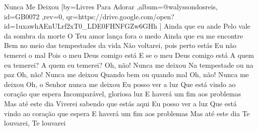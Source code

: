 \beginsong
{Nunca Me Deixou %
}[by={Livres Para Adorar %
},album={@walyssondosreis},
id={GB0072 %
},rev={0}, %
qr={https://drive.google.com/open?id=1uxawhAEnULrf2xT0_LDE0FHNFGZw6GHh %
}]
\beginverse*
Ainda que eu ande
Pelo vale da sombra da morte
O Teu amor lança fora o medo
Ainda que eu me encontre
Bem no meio das tempestades da vida
Não voltarei, pois perto estás
\endverse
\beginverse*
Eu não temerei o mal
Pois o meu Deus comigo está
E se o meu Deus comigo está
A quem eu temerei? A quem eu temerei?
\endverse
\beginchorus
Oh, não! Nunca me deixou
Na tempestade ou na paz
Oh, não! Nunca me deixou
Quando bem ou quando mal
Oh, não! Nunca me deixou
Oh, o Senhor nunca me deixou
\endchorus
\beginverse*
Eu posso ver a luz
Que está vindo ao coração que espera
Incomparável, gloriosa luz
E haverá um fim aos problemas
Mas até este dia
Viverei sabendo que estás aqui
\endverse
\beginverse*
Eu posso ver a luz
Que está vindo ao coração que espera
E haverá um fim aos problemas
Mas até este dia
Te louvarei, Te louvarei
\endverse

